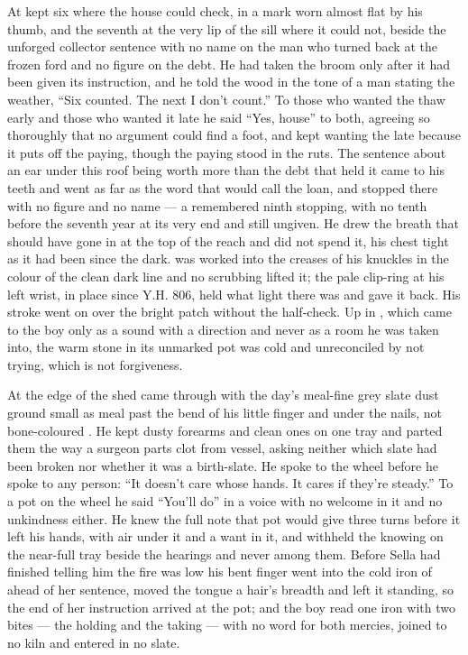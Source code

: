 At   kept six where the house could check, in a mark worn almost flat by his thumb, and the seventh at the very lip of the sill where it could not, beside the unforged collector sentence with no name on the man who turned back at the frozen ford and no figure on the debt. He had taken the broom only after it had been given its instruction, and he told the wood in the tone of a man stating the weather, “Six counted. The next I don't count.” To those who wanted the thaw early and those who wanted it late he said “Yes, house” to both, agreeing so thoroughly that no argument could find a foot, and kept wanting the late because it puts off the paying, though the paying stood in the ruts. The sentence about an ear under this roof being worth more than the debt that held it came to his teeth and went as far as the word that would call the loan, and stopped there with no figure and no name --- a remembered ninth stopping, with no tenth before the seventh year at its very end and still ungiven. He drew the breath that should have gone in at the top of the reach and did not spend it, his chest tight as it had been since the dark.  was worked into the creases of his knuckles in the colour of the clean dark line and no scrubbing lifted it; the pale clip-ring at his left wrist, in place since Y.H. 806, held what light there was and gave it back. His stroke went on over the bright patch without the half-check. Up in , which came to the boy only as a sound with a direction and never as a room he was taken into, the warm stone in its unmarked pot was cold and unreconciled by not trying, which is not forgiveness.

At the edge of the shed  came through with the day's meal-fine grey slate dust ground small as meal past the bend of his little finger and under the nails, not bone-coloured . He kept dusty forearms and clean ones on one tray and parted them the way a surgeon parts clot from vessel, asking neither which slate had been broken nor whether it was a birth-slate. He spoke to the wheel before he spoke to any person: “It doesn't care whose hands. It cares if they're steady.” To a pot on the wheel he said “You'll do” in a voice with no welcome in it and no unkindness either. He knew the full note that pot would give three turns before it left his hands, with air under it and a want in it, and withheld the knowing on the near-full tray beside the hearings and never among them. Before Sella had finished telling him the fire was low his bent finger went into the cold iron of  ahead of her sentence, moved the tongue a hair's breadth and left it standing, so the end of her instruction arrived at the pot; and the boy read one iron with two bites --- the holding and the taking --- with no  word for both mercies, joined to no kiln and entered in no slate.

